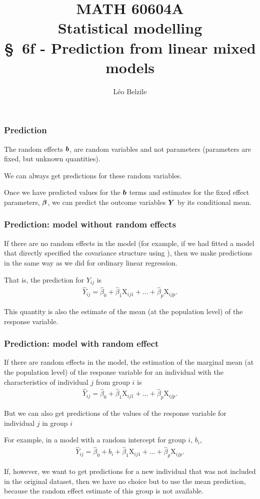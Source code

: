 \documentclass{beamer}
\title[\color{white}{MATH 60604A \S~6f - Prediction from linear mixed models}]{\texorpdfstring{MATH 60604A \\Statistical modelling \\ \S~6f - Prediction from linear mixed models}{MATH 60604A \\Statistical modelling \\ \S~6f - Prediction from linear mixed models}}
\author{Léo Belzile}
\institute{HEC Montréal\\
Department of Decision Sciences}
\date{}
\begin{document}
\frame{\titlepage}
\begin{frame}
\frametitle{Prediction}
\bi
\item The random effects $\boldsymbol {b}$, are \alert{random variables} and not parameters (parameters are fixed,  but unknown quantities). 
\item We can always get \alert{predictions} for these random variables. 
\item Once we have predicted values for the $\boldsymbol {b}$ terms and estimates for the fixed effect parameters, $\boldsymbol {\beta}$, we can predict the outcome variables $\boldsymbol {Y}$ by its conditional mean. 
\ei
\end{frame}


\begin{frame}
\frametitle{Prediction: model \textbf{without} random effects}
\bi
\item \alert{If there are no random effects in the model} (for example, if we had fitted a model that directly specified the covariance structure using ), then we make predictions in the same way as we did for ordinary linear regression. 
\item That is, the prediction for $Y_{ij}$ is
\begin{align*}
\hat{Y}_{ij}=\hat{\beta}_0 + \hat{\beta}_1\mathrm{X}_{ij1} + \ldots + \hat{\beta}_p\mathrm{X}_{ijp}.
\end{align*}
\item This quantity is also the estimate of the \alert{mean} (at the \alert{population level}) of the response variable.
\ei
\end{frame}

\begin{frame}
\frametitle{Prediction: model \textbf{with} random effect}
\bi
\item If there are random effects in the model, the estimation of the \alert{marginal mean} (at the \alert{population level}) of the response variable for an individual with the characteristics of individual $j$ from group $i$ is
\begin{align*}
\hat{Y}_{ij}=\hat{\beta}_0 + \hat{\beta}_1\mathrm{X}_{ij1} + \ldots + \hat{\beta}_p\mathrm{X}_{ijp}.
\end{align*}


\item But we can also get predictions of the
values of the response variable for individual $j$ in group $i$
\item For example, in a model with a random intercept for group $i$, $b_{i}$,
 \begin{align*}
\hat{Y}_{ij}=\hat{\beta}_0 +\hat{b}_{i} + \hat{\beta}_1\mathrm{X}_{ij1} + \ldots + \hat{\beta}_p\mathrm{X}_{ijp}. 
\end{align*}

\item If, however, we want to get predictions for a \alert{new}
individual that was not included in the original dataset, then we have no choice but to use the mean prediction, because the random effect estimate of this group is not available.
\ei
\end{frame}
\end{document}
